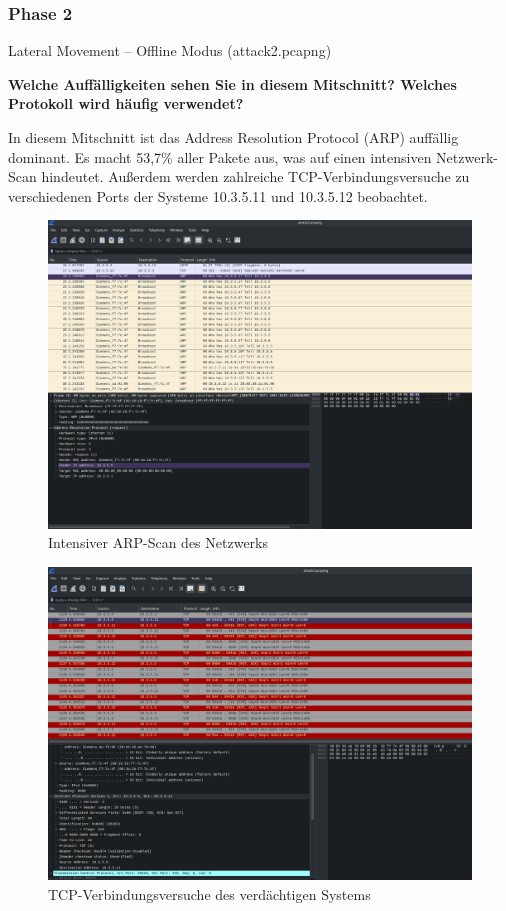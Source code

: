 \documentclass[
    a4paper,
    pagesize,
	pdftex,
    12pt,
]{scrartcl}
\begin{document}
\subsubsection{Phase 2}
Lateral Movement – Offline Modus (attack2.pcapng)

\textbf{Welche Auffälligkeiten sehen Sie in diesem Mitschnitt? Welches Protokoll wird häufig verwendet?}

In diesem Mitschnitt ist das Address Resolution Protocol (ARP) auffällig dominant. Es macht 53,7\% aller Pakete aus, was auf einen intensiven Netzwerk-Scan hindeutet. Außerdem werden zahlreiche TCP-Verbindungsversuche zu verschiedenen Ports der Systeme 10.3.5.11 und 10.3.5.12 beobachtet.

\begin{figure}[H]
    \centering
    \includegraphics[width=\textwidth]{ws-arp-scan.png}
    \caption{Intensiver ARP-Scan des Netzwerks}
    \label{fig:ws-arp-scan}
\end{figure}

\begin{figure}[H]
    \centering
    \includegraphics[width=\textwidth]{ws-port-scan.png}
    \caption{TCP-Verbindungsversuche des verdächtigen Systems}
    \label{fig:ws-arp-scan}
\end{figure}
\end{document}
